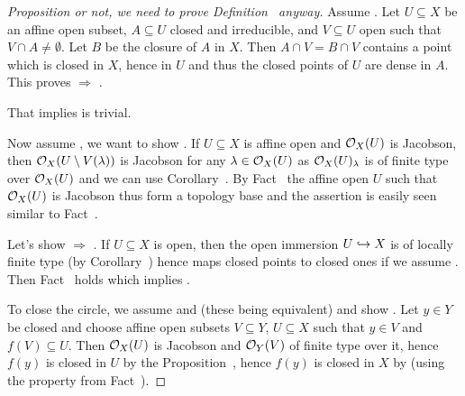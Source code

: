 \documentclass[a4paper,parskip=half,numbers=enddot, DIV=12]{scrreprt}
\begin{document}
\begin{proof}[Proposition or not, we need to prove Definition~ anyway]
    Assume . Let $U\subseteq X$ be an affine open subset, $A\subseteq U$ closed and irreducible, and $V\subseteq U$ open such that $V\cap A\neq \emptyset$. Let $B$ be the closure of $A$ in $X$. Then $A\cap V = B\cap V$ contains a point which is closed in $X$, hence in $U$ and thus the closed points of $U$ are dense in $A$. This proves  $\Rightarrow $ .
    
    That  implies  is trivial.
    
    Now assume , we want to show . If $U\subseteq X$ is affine open and $\mathcal{O}_X(U)$ is Jacobson, then $\mathcal{O}_X(U\setminus V(\lambda))$ is Jacobson for any $\lambda\in \mathcal{O}_X(U)$ as $\mathcal{O}_X(U)_\lambda$ is of finite type over $\mathcal{O}_X(U)$ and we can use Corollary~. By Fact~ the affine open $U$ such that $\mathcal{O}_X(U)$ is Jacobson thus form a topology base and the assertion is easily seen similar to Fact~.
    
    Let's show  $\Rightarrow$ . If $U\subseteq X$ is open, then the open immersion $U\monomorphism X$ is of locally finite type (by Corollary~) hence maps closed points to closed ones if we assume . Then Fact~ holds which implies .
    
    To close the circle, we assume  and  (these being equivalent) and show . Let $y\in Y$ be closed and choose affine open subsets $V\subseteq Y$, $U\subseteq X$ such that $y\in V$ and $f(V)\subseteq U$. Then $\mathcal{O}_X(U)$ is Jacobson and $\mathcal{O}_Y(V)$ of finite type over it, hence $f(y)$ is closed in $U$ by the Proposition~, hence $f(y)$ is closed in $X$ by  (using the property from Fact~).
\end{proof}
\end{document}
